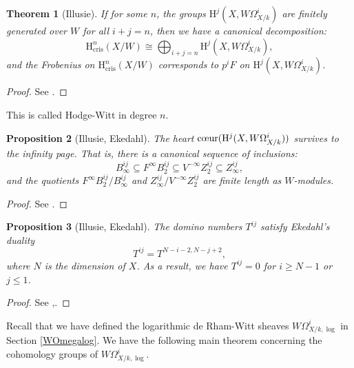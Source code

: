 \documentclass[a4paper,12pt,twoside]{report}
\newtheorem{theorem}{Theorem}[section]
\newtheorem{proposition}[theorem]{Proposition}
\newcommand{\cris}{\mathrm{cris}}
\newcommand{\HH}{\mathrm{H}}
\begin{document}
\begin{theorem}[Illusie]\label{HodgeWittn}
    If for some $n$, the groups \(\HH^j(X,W\Omega^i_{X/k})\) are finitely generated over \(W\) for all \(i+j=n\), 
    then we have a canonical decomposition: 
    \[\HH^n_{\cris}(X/W)\cong \bigoplus_{i+j=n}\HH^j(X,W\Omega^i_{X/k}),\] 
    and the Frobenius on \(\HH^n_{\cris}(X/W)\) corresponds to \(p^iF\) on \(\HH^j(X,W\Omega^i_{X/k})\). 
\end{theorem}

\begin{proof}
    See \cite[Theorem IV.4.5]{IR}.
\end{proof}

This is called Hodge-Witt in degree $n$. 

\begin{proposition}[Illusie, Ekedahl]\label{Survivesofcoeur}
    The heart $\text{{\rm c\oe ur}}(\HH^j(X,W\Omega^i_{X/k}))$ survives to the infinity page. That is, 
    there is a canonical sequence of inclusions: 
    \[B_\infty^{ij}\subseteq F^{\infty}B_2^{ij}\subseteq V^{-\infty} Z_2^{ij}\subseteq Z_\infty^{ij}, \]
    and the quotients $F^{\infty}B_2^{ij}/B_\infty^{ij}$ and $Z_\infty^{ij}/V^{-\infty} Z_2^{ij}$ are finite length as $W$-modules.
\end{proposition}

\begin{proof}
    See \cite[Theorem II.3.4]{IR}. 
\end{proof}

\begin{proposition}[Illusie, Ekedahl]\label{Ekedahlduality}\label{EasyVan}
    The domino numbers $T^{ij}$ satisfy Ekedahl's duality \[T^{ij}=T^{N-i-2,N-j+2},\] 
    where $N$ is the dimension of $X$. 
    As a result, we have $T^{ij}=0$ for $i\geqslant N-1$ or $j\leqslant 1$.
\end{proposition} 

\begin{proof}
    See \cite[Corollary II.2.17, Propositions II.2.19 and II.3.12]{Il1},\cite[IV. Corollary 3.5.1]{Ek1}.
\end{proof}

Recall that we have defined the logarithmic de Rham-Witt sheaves \(W\Omega^i_{X/k,\log}\) in Section \ref{WOmegalog}. 
We have the following main theorem concerning the cohomology groups of \(W\Omega^i_{X/k,\log}\).
\end{document}

